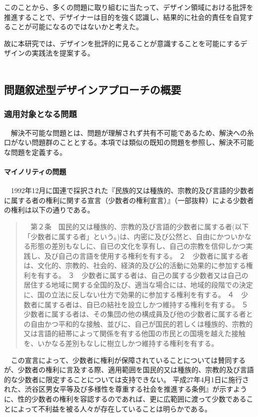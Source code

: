 \documentclass{jsarticle}
\begin{document}
 このことから、多くの問題に取り組むに当たって、デザイン領域における批評を推進することで、デザイナーは目的を強く認識し、結果的に社会的責任を自覚することが可能になるのではないかと考えた。




故に本研究では、デザインを批評的に見ることが意識することを可能にするデザインの実践法を提案する。
　　　　　　　　　　　　　　　　　　　　　　　　　　　　　　　　　　　　　　　　
\newpage
\subsection{問題叙述型デザインアプローチの概要}

\subsubsection{適用対象となる問題}

　解決不可能な問題とは、問題が理解されず共有不可能であるため、解決への糸口がない問題群のこととする。本項では類似の既知の問題を参照し、解決不可能な問題を定義する。

\paragraph*{マイノリティの問題}
　1992年12月に国連で採択された『民族的又は種族的、宗教的及び言語的少数者に属する者の権利に関する宣言（少数者の権利宣言）』\cite{minorities}（一部抜粋）による少数者の権利は以下の通りである。

\begin{quotation}
　第２条　国民的又は種族的、宗教的及び言語的少数者に属する者(以下「少数者に属する者」という。)は、内密に及び公然と、自由にかついかなる形態の差別もなしに、自已の文化を享有し、自己の宗教を信仰しかつ実践し、及び自己の言語を使用する権利を有する。
２　少数者に属する者は、文化的、宗教的、社会的、経済的及び公的活動に効果的に参加する権利を有する。
３　少数者に属する者は、自己の属する少数者又は自己の居住する地域に関する全国的及び、適当な場合には、地域的段階での決定に、国の立法に反しない仕方で効果的に参加する権利を有する。
４　少数者に属する者は、自已の結社を設立しかつ維持する権利を有する。
５　少数者に属する者は、その集団の他の構成員及び他の少数者に属する者との自由かつ平和的な接触、並びに、自己が国民的若しくは種族的、宗教的又は言語的紐帯によって関係を有する他国の市民との国境を越えた接触を、いかなる差別もなしに樹立しかつ維持する権利を有する。
\end{quotation}
　この宣言によって、少数者に権利が保障されていることについては賛同するが、少数者の権利に言及する際、適用範囲を国民的又は種族的、宗教的及び言語的な少数者に限定することについては支持できない。
平成27年4月1日に施行された、渋谷区男女平等及び多様性を尊重する社会を推進する条例』\cite{shibuya}が示すように、性的少数者の権利を容認するのであれば、更に広範囲に渡って少数であることによって不利益を被る人々が存在していることは明らかである。
\end{document}
